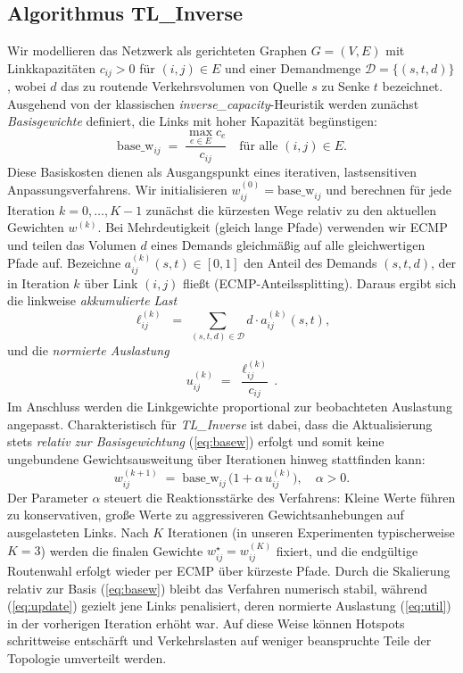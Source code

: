 \documentclass[sigconf,nonacm,review]{acmart}
\begin{document}
\subsection{Algorithmus \texorpdfstring{\textbf{TL\_Inverse}}{TL_Inverse}}
Wir modellieren das Netzwerk als gerichteten Graphen $G=(V,E)$ mit Linkkapazitäten $c_{ij}>0$ für $(i,j)\in E$ und einer Demandmenge
$\mathcal{D}=\{(s,t,d)\}$, wobei $d$ das zu routende Verkehrsvolumen von Quelle $s$ zu Senke $t$ bezeichnet. Ausgehend von der klassischen
\emph{inverse\_capacity}-Heuristik werden zunächst \emph{Basisgewichte} definiert, die Links mit hoher Kapazität begünstigen:
\begin{equation}
\mathrm{base\_w}_{ij} \;=\; \frac{\max_{e\in E} c_e}{c_{ij}}
\quad\text{für alle }(i,j)\in E.
\label{eq:basew}
\end{equation}
Diese Basiskosten dienen als Ausgangspunkt eines iterativen, lastsensitiven Anpassungsverfahrens. Wir initialisieren $w^{(0)}_{ij}=\mathrm{base\_w}_{ij}$ und berechnen
für jede Iteration $k=0,\dots,K-1$ zunächst die kürzesten Wege relativ zu den aktuellen Gewichten $w^{(k)}$. Bei Mehrdeutigkeit (gleich lange Pfade)
verwenden wir ECMP und teilen das Volumen $d$ eines Demands gleichmäßig auf alle gleichwertigen Pfade auf. Bezeichne $a^{(k)}_{ij}(s,t)\in[0,1]$
den Anteil des Demands $(s,t,d)$, der in Iteration $k$ über Link $(i,j)$ fließt (ECMP-Anteilssplitting). Daraus ergibt sich die linkweise
\emph{akkumulierte Last}
\begin{equation}
\ell^{(k)}_{ij} \;=\; \sum_{(s,t,d)\in\mathcal{D}} d \cdot a^{(k)}_{ij}(s,t),
\label{eq:load}
\end{equation}
und die \emph{normierte Auslastung}
\begin{equation}
u^{(k)}_{ij} \;=\; \frac{\ell^{(k)}_{ij}}{c_{ij}}\,.
\label{eq:util}
\end{equation}
Im Anschluss werden die Linkgewichte proportional zur beobachteten Auslastung angepasst. Charakteristisch für \textit{TL\_Inverse} ist dabei,
dass die Aktualisierung stets \emph{relativ zur Basisgewichtung} (\ref{eq:basew}) erfolgt und somit keine ungebundene Gewichtsausweitung
über Iterationen hinweg stattfinden kann:
\begin{equation}
w^{(k+1)}_{ij} \;=\; \mathrm{base\_w}_{ij}\,\bigl(1 + \alpha\,u^{(k)}_{ij}\bigr),
\quad\alpha>0.
\label{eq:update}
\end{equation}
Der Parameter $\alpha$ steuert die Reaktionsstärke des Verfahrens: Kleine Werte führen zu konservativen, große Werte zu aggressiveren
Gewichtsanhebungen auf ausgelasteten Links. Nach $K$ Iterationen (in unseren Experimenten typischerweise $K=3$) werden die finalen Gewichte
$w^{\star}_{ij}=w^{(K)}_{ij}$ fixiert, und die endgültige Routenwahl erfolgt wieder per ECMP über kürzeste Pfade. Durch die Skalierung relativ
zur Basis (\ref{eq:basew}) bleibt das Verfahren numerisch stabil, während (\ref{eq:update}) gezielt jene Links penalisiert, deren
normierte Auslastung (\ref{eq:util}) in der vorherigen Iteration erhöht war. Auf diese Weise können Hotspots schrittweise entschärft und
Verkehrslasten auf weniger beanspruchte Teile der Topologie umverteilt werden.
\end{document}
